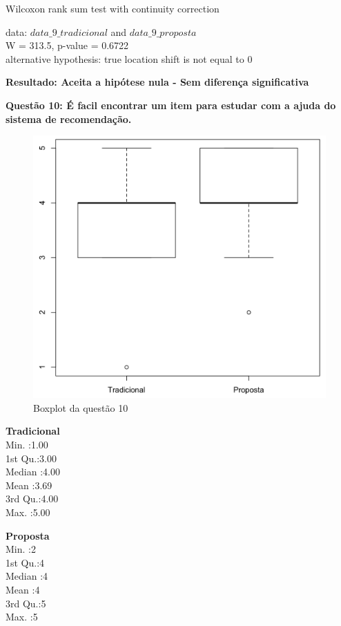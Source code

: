 Wilcoxon rank sum test with continuity correction

\noindent
data:  $data\_9\_tradicional$ and $data\_9\_proposta$\\
W = 313.5, p-value = 0.6722\\
alternative hypothesis: true location shift is not equal to 0

\textbf{Resultado: Aceita a hipótese nula - Sem diferença significativa}

\newpage
\textbf{Questão 10: É facil encontrar um item para estudar com a ajuda do sistema de recomendação.}

\begin{figure}[htb]
  \caption{\label{fig:questao10-boxplot}Boxplot da questão 10}
  \begin{center}
      \includegraphics[scale=0.4]{./Figuras/questao10-boxplot.png}
  \end{center}
\end{figure}

\begin{multicols}{2}

\noindent\textbf{Tradicional}\\
Min.   :1.00\\
1st Qu.:3.00\\
Median :4.00\\
Mean   :3.69\\
3rd Qu.:4.00\\
Max.   :5.00\\
\columnbreak

\noindent\textbf{Proposta}\\
Min.   :2\\
1st Qu.:4\\
Median :4\\
Mean   :4\\
3rd Qu.:5\\
Max.   :5
\end{multicols}

